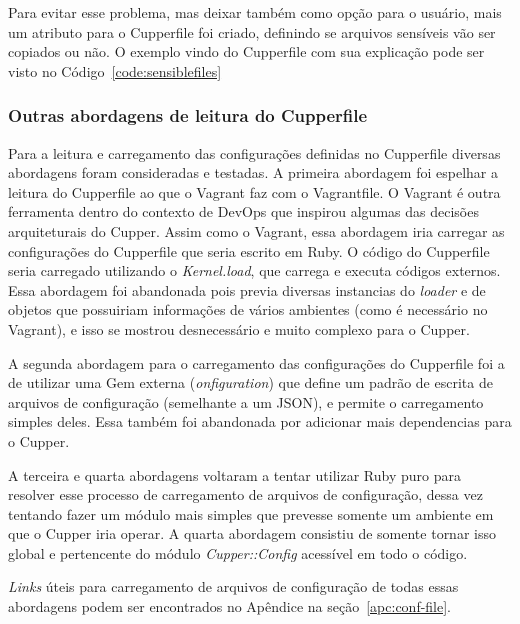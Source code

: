 Para evitar esse problema, mas deixar também como opção para o usuário, mais um
atributo para o Cupperfile foi criado, definindo se arquivos sensíveis vão ser
copiados ou não. O exemplo vindo do Cupperfile com sua explicação pode ser visto no
Código~\ref{code:sensiblefiles}

\noindent\begin{minipage}{0.7\textwidth}
  \lstset{style=shell}
  
\end{minipage}\hfill

\subsubsection{Outras abordagens de leitura do Cupperfile}
Para a leitura e carregamento das configurações definidas no Cupperfile diversas
abordagens foram consideradas e testadas. A primeira abordagem foi espelhar a
leitura do Cupperfile ao que o Vagrant faz com o Vagrantfile. O Vagrant é outra
ferramenta dentro do contexto de DevOps que inspirou algumas das decisões arquiteturais
do Cupper. Assim como o Vagrant, essa abordagem iria carregar as configurações
do Cupperfile que seria escrito em Ruby. O código do Cupperfile seria carregado
utilizando o \textit{Kernel.load}, que carrega e executa códigos externos.
Essa abordagem foi abandonada pois previa diversas instancias do \textit{loader}
e de objetos que possuiriam informações de vários ambientes (como é necessário
no Vagrant), e isso se mostrou desnecessário e muito complexo para o Cupper.

A segunda abordagem para o carregamento das configurações do Cupperfile foi a de
utilizar uma Gem externa (\textit{onfiguration}) que define um padrão de escrita de 
arquivos de configuração (semelhante a um JSON), e permite o carregamento 
simples deles. Essa também foi abandonada por adicionar mais dependencias para o Cupper.

A terceira e quarta abordagens voltaram a tentar utilizar Ruby puro para resolver
esse processo de carregamento de arquivos de configuração, dessa vez tentando 
fazer um módulo mais simples que prevesse somente um ambiente em que o Cupper
iria operar. A quarta abordagem consistiu de somente tornar isso global e
pertencente do módulo \textit{Cupper::Config} acessível em todo o código.

\textit{Links} úteis para carregamento de arquivos de configuração de todas essas
abordagens podem ser encontrados no Apêndice na seção~\ref{apc:conf-file}.

